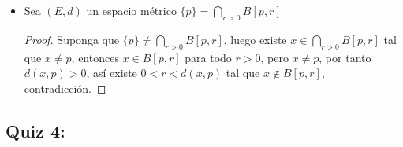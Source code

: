 \begin{itemize}[leftmargin=*]
\item Sea $(E,d)$ un espacio métrico $\{p\}=\bigcap_{r>0} B[p, r]$\\

\begin{proof}
Suponga que $\{p\}\neq \bigcap_{r>0} B[p, r]$, luego existe $x\in \bigcap_{r>0} B[p, r]$ tal que $x\neq p$, entonces $x \in B[p,r]$ para todo $r>0$, pero $x\neq p$, por tanto $d(x,p)>0$, así existe $0<r<d(x,p)$ tal que $x\not \in B[p,r]$, contradicción.
 \end{proof}
\end{itemize}


\subsection{Quiz 4:}

